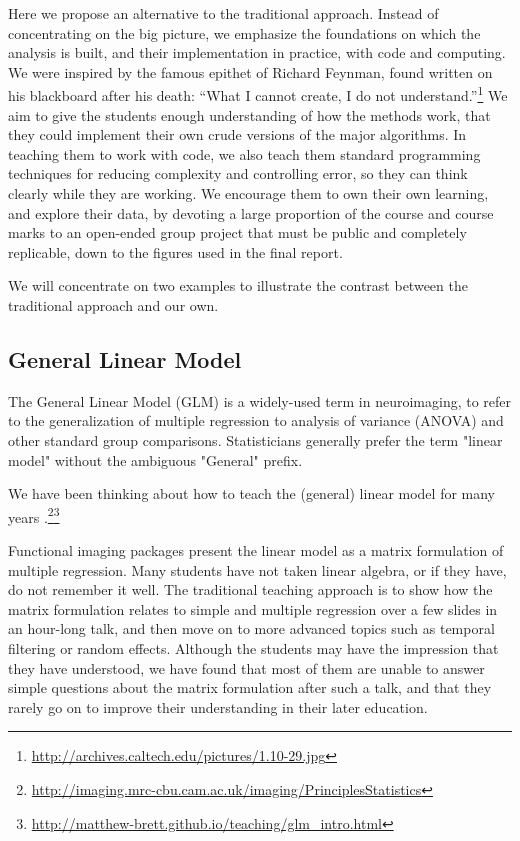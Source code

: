 Here we propose an alternative to the traditional approach.  Instead of
concentrating on the big picture, we emphasize the foundations on which the
analysis is built, and their implementation in practice, with code and
computing.  We were inspired by the famous epithet of Richard Feynman, found
written on his blackboard after his death: ``What I cannot create, I do not
understand.''\footnote{\url{http://archives.caltech.edu/pictures/1.10-29.jpg}}
We aim to give the students enough understanding of how the methods work, that
they could implement their own crude versions of the major algorithms.  In
teaching them to work with code, we also teach them standard programming
techniques for reducing complexity and controlling error, so they can think
clearly while they are working.  We encourage them to own their own learning,
and explore their data, by devoting a large proportion of the course and
course marks to an open-ended group project that must be public and completely
replicable, down to the figures used in the
final report.

We will concentrate on two examples to illustrate the contrast between the
traditional approach and our own.

\subsection{General Linear Model}

The General Linear Model (GLM) is a widely-used term in neuroimaging, to refer
to the generalization of multiple regression to analysis of variance (ANOVA)
and other standard group comparisons.  Statisticians generally prefer the term
"linear model" without the ambiguous "General" prefix.

We have been thinking about how to teach the (general) linear model for many
years
\citep{poline2012general}.\footnote{\url{http://imaging.mrc-cbu.cam.ac.uk/imaging/PrinciplesStatistics}}\footnote{\label{glm_intro}
\url{http://matthew-brett.github.io/teaching/glm_intro.html}}

Functional imaging packages present the linear model as a matrix formulation
of multiple regression.  Many students have not taken linear algebra, or if
they have, do not remember it well.  The traditional teaching approach is to
show how the matrix formulation relates to simple and multiple regression over
a few slides in an hour-long talk, and then move on to more advanced topics
such as temporal filtering or random effects.  Although the students may have
the impression that they have understood, we have found that most of them are
unable to answer simple questions about the matrix formulation after such a
talk, and that they rarely go on to improve their understanding in their later
education.

